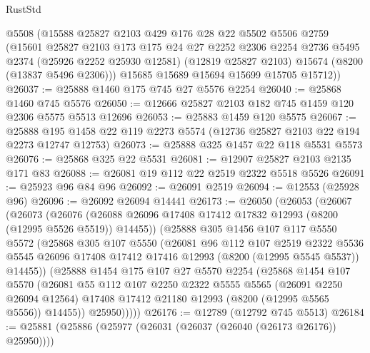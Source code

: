 \begin{lexlean}{RustStd}
\begin{coremodule}
      @5508
      (@15588
        @25827
        @2103
        @429
        @176
        @28
        @22
        @5502
        @5506
        @2759
        (@15601
          @25827
          @2103
          @173
          @175
          @24
          @27
          @2252
          @2306
          @2254
          @2736
          @5495
          @2374
          (@25926 @2252 @25930 @12581)
          (@12819 @25827 @2103)
          @15674
          (@8200 (@13837 @5496 @2306)))
        @15685
        @15689
        @15694
        @15699
        @15705
        @15712))
@26037 := @25888 @1460 @175 @745 @27 @5576 @2254
@26040 := @25868 @1460 @745 @5576
@26050 := @12666 @25827 @2103 @182 @745 @1459 @120 @2306 @5575 @5513 @12696
@26053 := @25883 @1459 @120 @5575
@26067 := @25888 @195 @1458 @22 @119 @2273 @5574 (@12736 @25827 @2103 @22 @194 @2273 @12747 @12753)
@26073 := @25888 @325 @1457 @22 @118 @5531 @5573
@26076 := @25868 @325 @22 @5531
@26081 := @12907 @25827 @2103 @2135 @171 @83
@26088 := @26081 @19 @112 @22 @2519 @2322 @5518 @5526
@26091 := @25923 @96 @84 @96
@26092 := @26091 @2519
@26094 := @12553 (@25928 @96)
@26096 := @26092 @26094 @14441
@26173 := @26050
    (@26053
      (@26067
        (@26073
          (@26076 (@26088 @26096 @17408 @17412 @17832 @12993 (@8200 (@12995 @5526 @5519)) @14455))
          (@25888
            @305
            @1456
            @107
            @117
            @5550
            @5572
            (@25868
              @305
              @107
              @5550
              (@26081
                @96
                @112
                @107
                @2519
                @2322
                @5536
                @5545
                @26096
                @17408
                @17412
                @17416
                @12993
                (@8200 (@12995 @5545 @5537))
                @14455))
            (@25888
              @1454
              @175
              @107
              @27
              @5570
              @2254
              (@25868
                @1454
                @107
                @5570
                (@26081
                  @55
                  @112
                  @107
                  @2250
                  @2322
                  @5555
                  @5565
                  (@26091 @2250 @26094 @12564)
                  @17408
                  @17412
                  @21180
                  @12993
                  (@8200 (@12995 @5565 @5556))
                  @14455))
              @25950)))))
@26176 := @12789 (@12792 @745 @5513)
@26184 := @25881 (@25886 (@25977 (@26031 (@26037 (@26040 (@26173 @26176)) @25950))))

\end{coremodule}
\end{lexlean}
